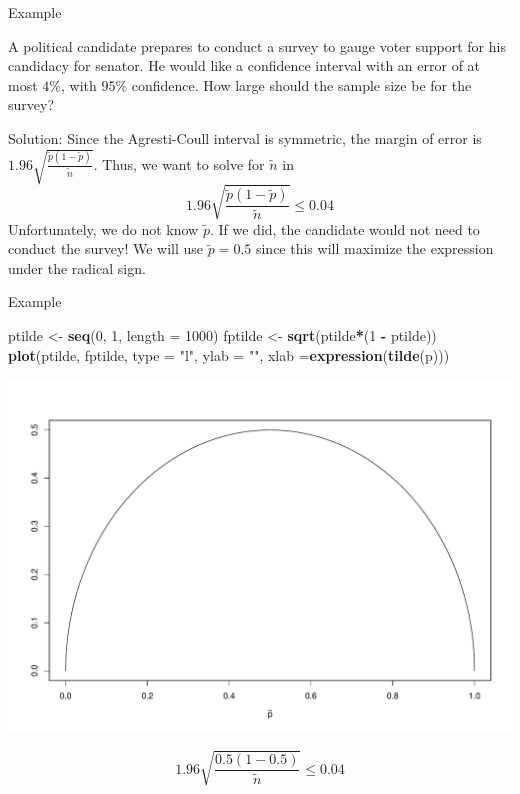 \documentclass[
  ignorenonframetext,
]{beamer}
\newenvironment{Shaded}{\begin{snugshade}}{\end{snugshade}}
\newcommand{\AttributeTok}[1]{\textcolor[rgb]{0.13,0.29,0.53}{#1}}
\newcommand{\DecValTok}[1]{\textcolor[rgb]{0.00,0.00,0.81}{#1}}
\newcommand{\FunctionTok}[1]{\textcolor[rgb]{0.13,0.29,0.53}{\textbf{#1}}}
\newcommand{\NormalTok}[1]{#1}
\newcommand{\OtherTok}[1]{\textcolor[rgb]{0.56,0.35,0.01}{#1}}
\newcommand{\SpecialCharTok}[1]{\textcolor[rgb]{0.81,0.36,0.00}{\textbf{#1}}}
\newcommand{\StringTok}[1]{\textcolor[rgb]{0.31,0.60,0.02}{#1}}
\begin{document}
\begin{frame}{Example}
\protect\hypertarget{example}{}
\begin{tcolorbox}
A political candidate prepares to conduct a survey to gauge voter support for his candidacy for senator. He would like a confidence interval with an error of at most $4\%$, with $95\%$ confidence. How large should the sample size be for the survey? 
\end{tcolorbox}

\begin{tcolorbox}
Solution:  Since the Agresti-Coull interval is symmetric, the margin of error is $1.96\sqrt{\frac{\tilde{p}(1-\tilde{p})}{\tilde{n}}}$. Thus, we want to solve for $\tilde{n}$ in $$1.96\sqrt{\frac{\tilde{p}(1-\tilde{p})}{\tilde{n}}}\leq 0.04$$
Unfortunately, we do not know $\tilde{p}$. If we did, the candidate would not need to conduct the survey! We will use $\tilde{p}=0.5$ since this will maximize the expression under the radical sign. 

\end{tcolorbox}
\end{frame}

\begin{frame}[fragile]{Example}
\protect\hypertarget{example-3}{}
\tiny

\begin{Shaded}
\begin{Highlighting}[]
\NormalTok{ptilde }\OtherTok{\textless{}{-}} \FunctionTok{seq}\NormalTok{(}\DecValTok{0}\NormalTok{, }\DecValTok{1}\NormalTok{, }\AttributeTok{length =} \DecValTok{1000}\NormalTok{)}
\NormalTok{fptilde }\OtherTok{\textless{}{-}} \FunctionTok{sqrt}\NormalTok{(ptilde}\SpecialCharTok{*}\NormalTok{(}\DecValTok{1} \SpecialCharTok{{-}}\NormalTok{ ptilde))}
\FunctionTok{plot}\NormalTok{(ptilde, fptilde, }\AttributeTok{type =} \StringTok{"l"}\NormalTok{, }\AttributeTok{ylab =} \StringTok{""}\NormalTok{, }\AttributeTok{xlab =}\FunctionTok{expression}\NormalTok{(}\FunctionTok{tilde}\NormalTok{(p)))}
\end{Highlighting}
\end{Shaded}

\begin{center}\includegraphics[width=0.6\linewidth,height=0.4\textheight]{Week11_12_13_files/figure-beamer/unnamed-chunk-12-1} \end{center}
\normalsize

\[1.96\sqrt{\frac{0.5(1-0.5)}{\tilde{n}}}\leq 0.04\]
\end{frame}
\end{document}
